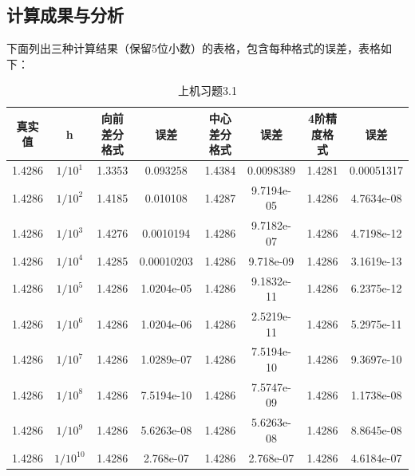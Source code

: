 \documentclass[10pt,a4paper]{ctexart}
\begin{document}
\subsection{计算成果与分析}
下面列出三种计算结果（保留5位小数）的表格，包含每种格式的误差，表格如下： 
\begin{center} 
\begin{longtable}{|c|c|c|c|c|c|c|c|}

\caption{上机习题3.1} \\ 
\hline 
真实值& h& 向前差分格式& 误差&中心差分格式& 误差& 4阶精度格式& 误差 \\
\hline
1.4286& $1/10^1$& 1.3353& 0.093258& 1.4384& 0.0098389& 1.4281& 0.00051317\\
\hline
1.4286& $1/10^2$& 1.4185& 0.010108& 1.4287& 9.7194e-05& 1.4286& 4.7634e-08\\
\hline
1.4286& $1/10^3$& 1.4276& 0.0010194& 1.4286& 9.7182e-07& 1.4286& 4.7198e-12\\
\hline
1.4286& $1/10^4$& 1.4285& 0.00010203& 1.4286& 9.718e-09& 1.4286& 3.1619e-13\\
\hline
1.4286& $1/10^5$& 1.4286& 1.0204e-05& 1.4286& 9.1832e-11& 1.4286& 6.2375e-12\\
\hline
1.4286& $1/10^6$& 1.4286& 1.0204e-06& 1.4286& 2.5219e-11& 1.4286& 5.2975e-11\\
\hline
1.4286& $1/10^7$& 1.4286& 1.0289e-07& 1.4286& 7.5194e-10& 1.4286& 9.3697e-10\\
\hline
1.4286& $1/10^8$& 1.4286& 7.5194e-10& 1.4286& 7.5747e-09& 1.4286& 1.1738e-08\\
\hline
1.4286& $1/10^9$& 1.4286& 5.6263e-08& 1.4286& 5.6263e-08& 1.4286& 8.8645e-08\\
\hline
1.4286& $1/10^{10}$& 1.4286& 2.768e-07& 1.4286& 2.768e-07& 1.4286& 4.6184e-07\\
\hline
\end{longtable}
\end{center} 
\end{document}
